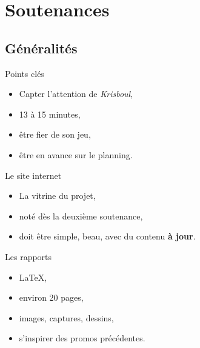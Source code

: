 
\section{Soutenances}

\subsection{Généralités}
\begin{frame}
  \begin{block}{Points clés}
    \begin{itemize}
    \item Capter l'attention de \emph{Krisboul},
    \item 13 à 15 minutes,
    \item être fier de son jeu,
    \item être en avance sur le planning.
    \end{itemize}
  \end{block}
\end{frame}

\begin{frame}
  \begin{block}{Le site internet}
    \begin{itemize}
    \item La vitrine du projet,
    \item noté dès la deuxième soutenance,
    \item doit être simple, beau, avec du contenu \textbf{à jour}.
    \end{itemize}
  \end{block}
\end{frame}

\begin{frame}
  \begin{block}{Les rapports}
    \begin{itemize}
    \item \LaTeX,
    \item environ 20 pages,
    \item images, captures, dessins,
    \item s'inspirer des promos précédentes.
    \end{itemize}
  \end{block}
\end{frame}
